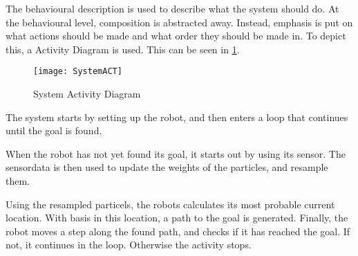 \documentclass[Main]{subfiles}
\begin{document}
		The behavioural description is used to describe what the system should do.
		At the behavioural level, composition is abstracted away. 
		Instead, emphasis is put on what actions should be made and what order they should be made in.
		To depict this, a Activity Diagram is used. This can be seen in \ref{fig:systemact}.
		
		\begin{figure}[H]
			\centering
			\texttt{[image: SystemACT]}
			\caption{System Activity Diagram}
			\label{fig:systemact}
		\end{figure}
		
		The system starts by setting up the robot, and then enters a loop that continues until the goal is found.
		
		When the robot has not yet found its goal, it starts out by using its sensor.
		The sensordata is then used to update the weights of the particles, and resample them.
		
		Using the resampled particels, the robots calculates its most probable current location.
		With basis in this location, a path to the goal is generated.
		Finally, the robot moves a step along the found path, and checks if it has reached the goal.
		If not, it continues in the loop. Otherwise the activity stops.


\end{document}
